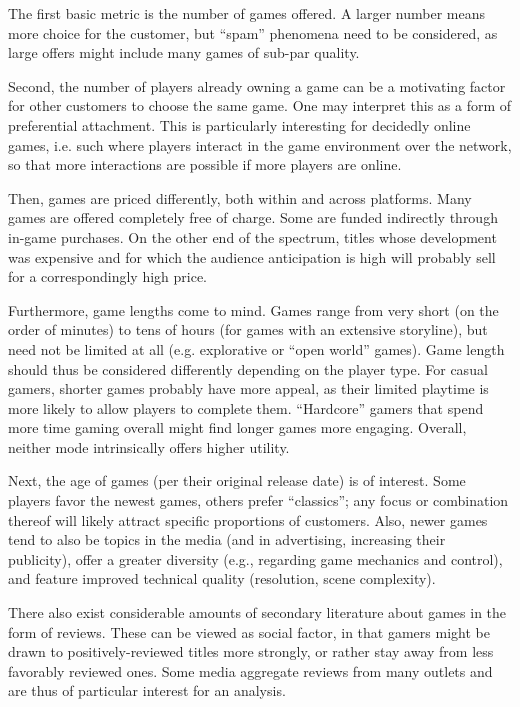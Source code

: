 The first basic metric is the number of games offered. A larger number
means more choice for the customer, but ``spam'' phenomena need to
be considered, as large offers might include many games of sub-par quality.

Second, the number of players already owning a game can be a
motivating factor for other customers to choose the same game.
One may interpret this as a form of preferential attachment.
This is particularly interesting for decidedly online games, i.e.
such where players interact in the game environment over the network,
so that more interactions are possible if more players are online.

Then, games are priced differently, both within and across
platforms. Many games are offered completely free of charge.
Some are funded indirectly through in-game purchases. On the
other end of the spectrum, titles whose development was expensive
and for which the audience anticipation is high will probably sell
for a correspondingly high price.

Furthermore, game lengths come to mind. Games range from very short
(on the order
of minutes) to tens of hours (for games with an extensive storyline),
but need not be limited at all (e.g. explorative or ``open world'' games).
Game length should thus be considered differently depending on
the player type. For casual gamers, shorter games probably have
more appeal, as their limited playtime is more likely to allow
players to complete them. ``Hardcore'' gamers that spend more
time gaming overall might find longer games more engaging.
Overall, neither mode intrinsically offers higher utility.

Next, the age of games (per their original release date) is of
interest. Some players favor the newest games, others prefer ``classics'';
any focus or combination thereof will likely attract specific
proportions of customers. Also, newer games tend to also be topics
in the media (and in advertising, increasing their publicity),
offer a greater diversity (e.g., regarding game mechanics and control),
and feature improved technical quality (resolution, scene complexity).


There also exist considerable amounts of secondary literature about
games in the form of reviews. These can be viewed as social factor,
in that gamers might be drawn to positively-reviewed titles more
strongly, or rather stay away from less favorably reviewed ones.
Some media aggregate reviews from many outlets and
are thus of particular interest for an analysis.

